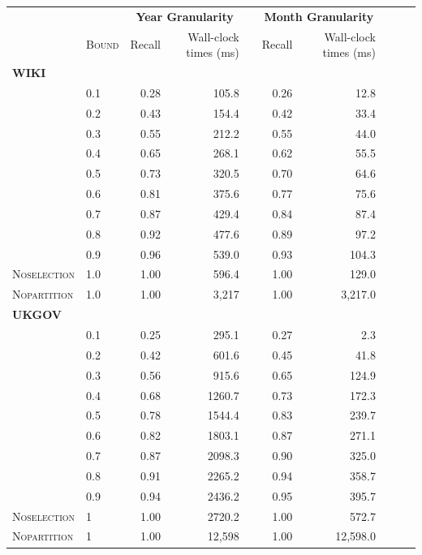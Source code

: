 \begin{table}\footnotesize
  \centering
  \begin{tabular}{@{}llrrrrrrrr@{}}
  \toprule
  \multicolumn{2}{l}{} & \multicolumn{2}{c}{\textbf{Year Granularity}} & \phantom{ab} & \multicolumn{2}{c}{\textbf{Month  Granularity}}\\ 
  \cmidrule{3-4} \cmidrule{6-7}
  &\textsc{Bound} & Recall & Wall-clock times (ms) && Recall & Wall-clock times (ms)\\
   \midrule
\textbf{WIKI}\\
& 0.1 & 0.28 & 105.8 && 0.26 & 12.8\\
& 0.2 & 0.43 & 154.4 && 0.42 & 33.4\\
& 0.3 & 0.55 & 212.2 && 0.55 & 44.0\\
& 0.4 & 0.65 & 268.1 && 0.62 & 55.5\\
& 0.5 & 0.73 & 320.5 && 0.70 & 64.6\\
& 0.6 & 0.81 & 375.6 && 0.77 & 75.6\\
& 0.7 & 0.87 & 429.4 && 0.84 & 87.4\\
& 0.8 & 0.92 & 477.6 && 0.89 & 97.2\\
& 0.9 & 0.96 & 539.0 && 0.93 & 104.3\\
\textsc{Noselection}& 1.0 & 1.00 & 596.4 && 1.00 & 129.0\\
\textsc{Nopartition} & 1.0 & 1.00 & 3,217 && 1.00 & 3,217.0\\
  \midrule
\textbf{UKGOV}\\

& 0.1 & 0.25 & 295.1 && 0.27 & 2.3\\
& 0.2 & 0.42 & 601.6 && 0.45 & 41.8\\
& 0.3 & 0.56 & 915.6 && 0.65 & 124.9\\
& 0.4 & 0.68 & 1260.7 && 0.73 & 172.3\\
& 0.5 & 0.78 & 1544.4 && 0.83 & 239.7\\
& 0.6 & 0.82 & 1803.1 && 0.87 & 271.1\\
& 0.7 & 0.87 & 2098.3 && 0.90 & 325.0\\
& 0.8 & 0.91 & 2265.2 && 0.94 & 358.7\\
& 0.9 & 0.94 & 2436.2 && 0.95 & 395.7\\
\textsc{Noselection}& 1 & 1.00 & 2720.2 && 1.00 & 572.7\\
\textsc{Nopartition} & 1 & 1.00 & 12,598 && 1.00 & 12,598.0\\


\end{tabular}
\end{table}

